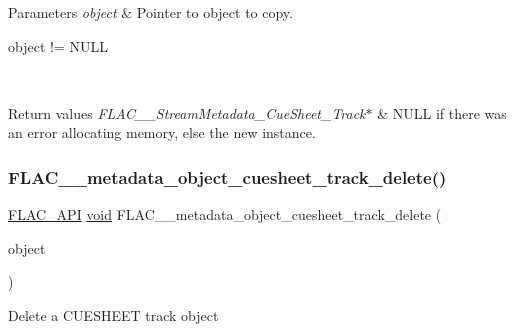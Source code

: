 \begin{DoxyParams}{Parameters}
{\em object} & Pointer to object to copy.  
\begin{DoxyCode}
\textcolor{keywordtype}{object} != NULL 
\end{DoxyCode}
 \\
\hline
\end{DoxyParams}

\begin{DoxyRetVals}{Return values}
{\em F\+L\+A\+C\+\_\+\+\_\+\+Stream\+Metadata\+\_\+\+Cue\+Sheet\+\_\+\+Track$\ast$} & {\ttfamily N\+U\+LL} if there was an error allocating memory, else the new instance. \\
\hline
\end{DoxyRetVals}
\mbox{\label{group__flac__metadata__object_ga8fbf8912add405a4b1acd510b6e27c89}} 
\subsubsection{\texorpdfstring{F\+L\+A\+C\+\_\+\+\_\+metadata\+\_\+object\+\_\+cuesheet\+\_\+track\+\_\+delete()}{FLAC\_\_metadata\_object\_cuesheet\_track\_delete()}}
{\footnotesize\ttfamily \hyperlink{group__flac__export_ga56ca07df8a23310707732b1c0007d6f5}{F\+L\+A\+C\+\_\+\+A\+PI} \hyperlink{png_8h_ac9c84fa68bbad002983e35ce3663c686}{void} F\+L\+A\+C\+\_\+\+\_\+metadata\+\_\+object\+\_\+cuesheet\+\_\+track\+\_\+delete (\begin{DoxyParamCaption}\item[{\hyperlink{struct_f_l_a_c_____stream_metadata___cue_sheet___track}{F\+L\+A\+C\+\_\+\+\_\+\+Stream\+Metadata\+\_\+\+Cue\+Sheet\+\_\+\+Track} $\ast$}]{object }\end{DoxyParamCaption})}

Delete a C\+U\+E\+S\+H\+E\+ET track object


